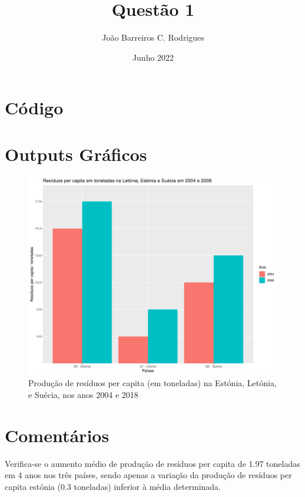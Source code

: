 \documentclass[a4paper,9pt]{extarticle}
\title{\vspace{-3cm} \large {\bfseries{Questão 1}}}
\author{João Barreiros C. Rodrigues}
\date{Junho 2022}
\begin{document}
	\maketitle
	\vspace{-1cm}
	\section{Código}
		
	\section{Outputs Gráficos}
		\begin{figure}[H]
                                \centering
                                \captionsetup{justification=centering}
                                \includegraphics[scale=0.29\textscale]{module1.png}
                                \caption{Produção de resíduos per capita (em toneladas) na Estónia, Letónia, e Suécia, nos anos 2004 e 2018}
        	\end{figure}
	\section{Comentários}
	Verifica-se o aumento médio de produção de resíduos per capita de 1.97 toneladas em 4 anos nos três países, sendo apenas a variação da produção de resíduos per capita estónia (0.3 toneladas) inferior à média determinada.
		
\end{document}

